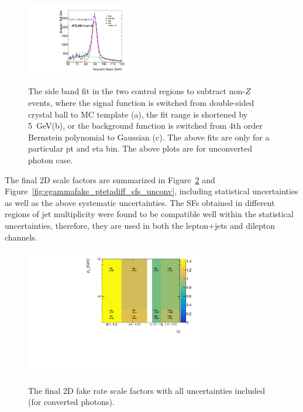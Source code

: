 \begin{figure}[!htbp]
{\includegraphics[width=0.40\textwidth]{figures/egammafakes/unconverted_ph/syst_bkg_var/Postfit_Zpeak_PtBin1_EtaBin1_zeg.pdf}\label{fig:egammafake_fit_bkg_unconverted}
}
\caption [] {The side band fit in the two control regions to subtract non-$Z$ events, where the signal function is switched from double-sided crystal ball to MC template (a), the fit range is shortened by 5~GeV(b), or the background function is switched from 4th order Bernstein polynomial to Gaussian (c). The above fits are only for a particular pt and eta bin. The above plots are for unconverted photon case.}
\label{fig:egammafake_fit_syst_unconverted}
\end{figure} 

The final 2D scale factors are summarized in Figure~\ref{fig:egammafake_ptetadiff_sfs_conv} and Figure~\ref{fig:egammafake_ptetadiff_sfs_unconv}, including statistical uncertainties as well as the above systematic uncertainties. The SFs obtained in different regions of jet multiplicity were found to be compatible well within the statistical uncertainties, therefore, they are used in both the lepton+jets and dilepton channels.

\begin{figure}[!htbp]
\centering
{\includegraphics[width=0.7\textwidth]{figures/egammafakes/Map_EFake_SF_Final_converted.pdf}}
\caption [] {The final 2D fake rate scale factors with all uncertainties included (for converted photons).}
\label{fig:egammafake_ptetadiff_sfs_conv}
\end{figure}   

